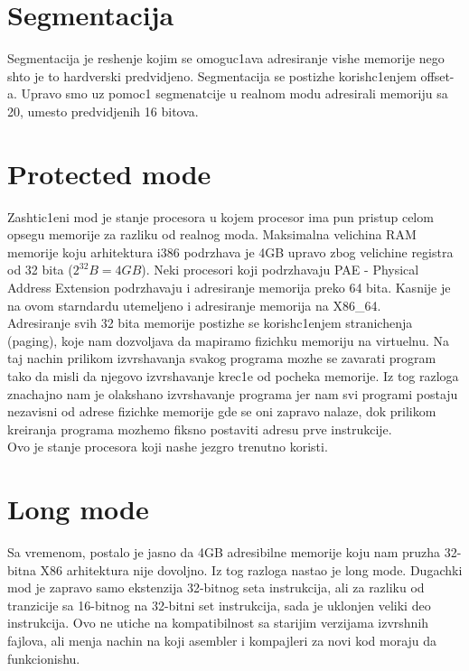 \documentclass[a4paper,fleqn,12pt]{JMThesis}
\newcommand\eng{\fontencoding{OT1}\fontfamily{\rmdefault}\selectfont}
\begin{document}
\section{Segmentacija}
\medskip

Segmentacija je reshenje kojim se omoguc1ava adresiranje vishe memorije nego
shto je to hardverski predvidjeno. Segmentacija se postizhe korish\/c1enjem
{\eng offset}-a. Upravo smo uz pomoc1 segmenatcije u realnom modu adresirali
memoriju sa 20, umesto predvidjenih 16 bitova.

\section{{\eng Protected mode}}
\medskip

Zashtic1eni mod je stanje procesora u kojem procesor ima pun pristup celom
opsegu memorije za razliku od realnog moda. Maksimalna velichina {\eng RAM}
memorije koju arhitektura {\eng i386} podrzhava je {\eng 4GB} upravo zbog
velichine registra od 32 bita ($2^{32}B = 4GB$). Neki procesori koji
podrzhavaju {\eng PAE - Physical Address Extension} podrzhavaju i adresiranje
memorija preko 64 bita. Kasnije je na ovom starndardu utemeljeno i adresiranje
memorija na {\eng X86\_64}.\\

Adresiranje svih 32 bita memorije postizhe se korish\/c1enjem stranichenja
({\eng paging}), koje nam dozvoljava da mapiramo fizichku memoriju na
virtuelnu. Na taj nachin prilikom izvrshavanja svakog programa mozhe se
zavarati program tako da misli da njegovo izvrshavanje krec1e od pocheka
memorije. Iz tog razloga znachajno nam je olakshano izvrshavanje programa jer
nam svi programi postaju nezavisni od adrese fizichke memorije gde se oni
zapravo nalaze, dok prilikom kreiranja programa mozhemo fiksno postaviti adresu
prve instrukcije.\\

Ovo je stanje procesora koji nashe jezgro trenutno koristi.

\section{{\eng Long mode}}
\medskip

Sa vremenom, postalo je jasno da {\eng 4GB} adresibilne memorije koju nam
pruzha 32-bitna {\eng X86} arhitektura nije dovoljno. Iz tog razloga nastao je
{\eng long mode}. Dugachki mod je zapravo samo ekstenzija 32-bitnog seta
instrukcija, ali za razliku od tranzicije sa 16-bitnog na 32-bitni set
instrukcija, sada je uklonjen veliki deo instrukcija. Ovo ne utiche na
kompatibilnost sa starijim verzijama izvrshnih fajlova, ali menja nachin na
koji asembler i kompajleri za novi kod moraju da funkcionishu.\\
\end{document}
